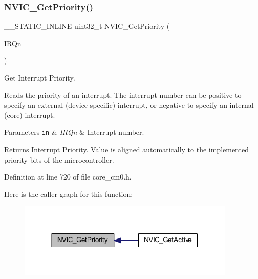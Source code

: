 \subsubsection{\texorpdfstring{N\+V\+I\+C\+\_\+\+Get\+Priority()}{NVIC\_GetPriority()}}
{\footnotesize\ttfamily \+\_\+\+\_\+\+S\+T\+A\+T\+I\+C\+\_\+\+I\+N\+L\+I\+NE uint32\+\_\+t N\+V\+I\+C\+\_\+\+Get\+Priority (\begin{DoxyParamCaption}\item[{\hyperlink{group___configuration__section__for___c_m_s_i_s_gac3af4a32370fb28c4ade8bf2add80251}{I\+R\+Qn\+\_\+\+Type}}]{I\+R\+Qn }\end{DoxyParamCaption})}



Get Interrupt Priority. 

Reads the priority of an interrupt. The interrupt number can be positive to specify an external (device specific) interrupt, or negative to specify an internal (core) interrupt. 
\begin{DoxyParams}[1]{Parameters}
\mbox{\tt in}  & {\em I\+R\+Qn} & Interrupt number. \\
\hline
\end{DoxyParams}
\begin{DoxyReturn}{Returns}
Interrupt Priority. Value is aligned automatically to the implemented priority bits of the microcontroller. 
\end{DoxyReturn}


Definition at line 720 of file core\+\_\+cm0.\+h.

Here is the caller graph for this function\+:
\nopagebreak
\begin{figure}[H]
\begin{center}
\leavevmode
\includegraphics[width=293pt]{group___c_m_s_i_s___core___n_v_i_c_functions_ga1cbaf8e6abd4aa4885828e7f24fcfeb4_icgraph}
\end{center}
\end{figure}
\mbox{\label{group___c_m_s_i_s___core___n_v_i_c_functions_ga394f7ce2ca826c0da26284d17ac6524d}} 

